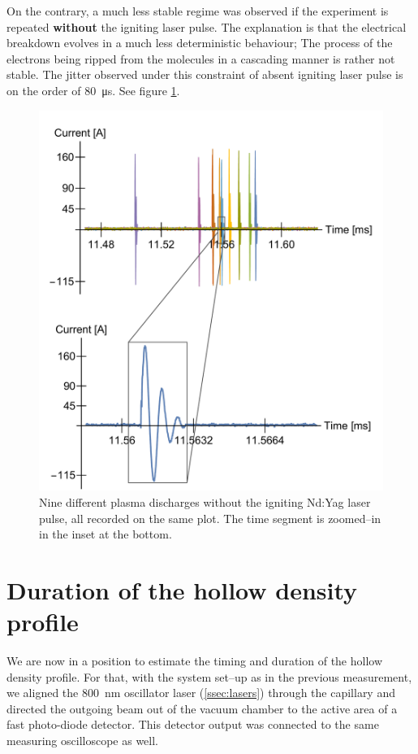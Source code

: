 \documentclass[../main.tex]{subfiles}
\begin{document}
On the contrary, a much less stable regime was observed if the experiment is repeated \textbf{without} the igniting laser pulse. The explanation is that the electrical breakdown evolves in a much less deterministic behaviour; The process of the electrons being ripped from the molecules in a cascading manner is rather not stable. The jitter observed under this constraint of absent igniting laser pulse is on the order of \SI{80}{\us}. See figure \ref{fig:multiple}.
\begin{figure}
    \centering
    \includegraphics[width=\textwidth]{figures/jitter/multiple.pdf}
    \caption{Nine different plasma discharges without the igniting Nd:Yag laser pulse, all recorded on the same plot. The time segment is zoomed--in in the inset at the bottom.}
    \label{fig:multiple}
\end{figure}

\section{Duration of the hollow density profile}\label{sec:duration-of-guiding}
We are now in a position to estimate the timing and duration of the hollow density profile. For that, with the system set--up as in the previous measurement, we aligned the \SI{800}{\nm} oscillator laser (\ref{ssec:lasers}) through the capillary and directed the outgoing beam out of the vacuum chamber to the active area of a fast photo-diode detector. This detector output was connected to the same measuring oscilloscope as well.
\end{document}
